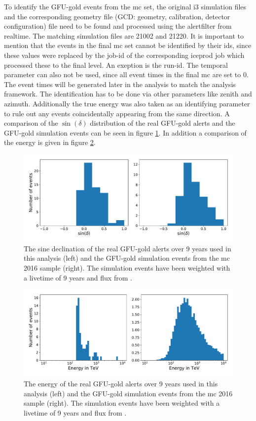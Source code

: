 To identify the GFU-gold events from the mc set, the original i3 simulation files and the corresponding geometry file (GCD: geometry, calibration, detector configuration) file need to be found and processed using the alertfilter from realtime.
The matching simulation files are 21002 and 21220.
It is important to mention that the events in the final mc set cannot be identified by their ids, since these values were replaced by the job-id of the corresponding iceprod job which processed these to the final level. An exeption is the run-id.
The temporal parameter can also not be used, since all event times in the final mc are set to \num{0}.
The event times will be generated later in the analysis to match the analysis framework.
The identification has to be done via other parameters like zenith and azimuth.
Additionally the true energy was also taken as an identifying parameter to rule out any events coincidentally appearing from the same direction.
A comparison of the $\sin{(\delta)}$ distribution of the real GFU-gold alerts and the GFU-gold simulation events can be seen in figure \ref{fig:gfu_gold_comp}.
In addition a comparison of the energy is given in figure \ref{fig:gfu_gold_comp_energy}.
\begin{figure}
    \centering
    \includegraphics[width=12cm]{Plots/03_data/gfu_gold_comp.pdf}
    \caption{The sine declination of the real GFU-gold alerts over 9 years used in this analysis (left) and the GFU-gold simulation events from the mc 2016 sample (right). The simulation events have been weighted with a livetime of 9 years and flux from \cite{flux}.}
    \label{fig:gfu_gold_comp}
\end{figure}
\begin{figure}
    \centering
    \includegraphics[width=12cm]{Plots/03_data/gfu_gold_energy_comp.pdf}
    \caption{The energy of the real GFU-gold alerts over 9 years used in this analysis (left) and the GFU-gold simulation events from the mc 2016 sample (right). The simulation events have been weighted with a livetime of 9 years and flux from \cite{flux}.}
    \label{fig:gfu_gold_comp_energy}
\end{figure}

